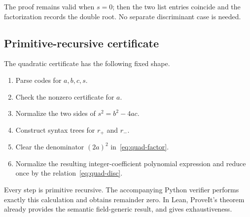 The proof remains valid when $s=0$; then the two list entries coincide and the
factorization records the double root.  No separate discriminant case is
needed.

\subsection{Primitive-recursive certificate}

The quadratic certificate has the following fixed shape.

\begin{enumerate}
\item Parse codes for $a,b,c,s$.
\item Check the nonzero certificate for $a$.
\item Normalize the two sides of $s^2=b^2-4ac$.
\item Construct syntax trees for $r_+$ and $r_-$.
\item Clear the denominator $(2a)^2$ in~\eqref{eq:quad-factor}.
\item Normalize the resulting integer-coefficient polynomial expression and
  reduce once by the relation~\eqref{eq:quad-disc}.
\end{enumerate}

Every step is primitive recursive.  The accompanying Python verifier performs
exactly this calculation and obtains remainder zero.  In Lean, ProveIt's
 theorem already provides the semantic
field-generic result, and  gives exhaustiveness.
